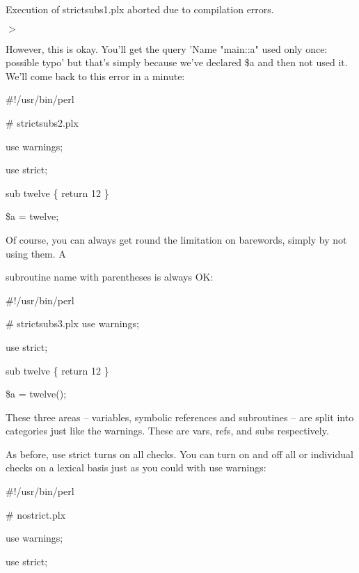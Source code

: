 \documentclass[a4paper,11pt]{book}
\begin{document}
\noindent Execution of strictsubs1.plx aborted due to compilation errors.

\noindent $>$

\noindent 

\noindent However, this is okay. You'll get the query 'Name "main::a" used only once: possible typo' but that's simply because we've declared \$a and then not used it. We'll come back to this error in a minute:

\noindent 

\noindent \#!/usr/bin/perl

\noindent \# strictsubs2.plx

\noindent use warnings;

\noindent use strict;

\noindent 

\noindent sub twelve \{ return 12 \}

\noindent \$a = twelve;

\noindent 

\noindent Of course, you can always get round the limitation on barewords, simply by not using them. A

\noindent subroutine name with parentheses is always OK:

\noindent 

\noindent \#!/usr/bin/perl

\noindent \# strictsubs3.plx use warnings;

\noindent use strict;

\noindent 

\noindent sub twelve \{ return 12 \}

\noindent \$a = twelve();

\noindent 

\noindent These three areas -- variables, symbolic references and subroutines -- are split into categories just like the warnings. These are vars, refs, and subs respectively.

\noindent 

\noindent As before, use strict turns on all checks. You can turn on and off all or individual checks on a lexical basis just as you could with use warnings:

\noindent 

\noindent 

\noindent \#!/usr/bin/perl

\noindent \# nostrict.plx

\noindent use warnings;

\noindent use strict;
\end{document}
